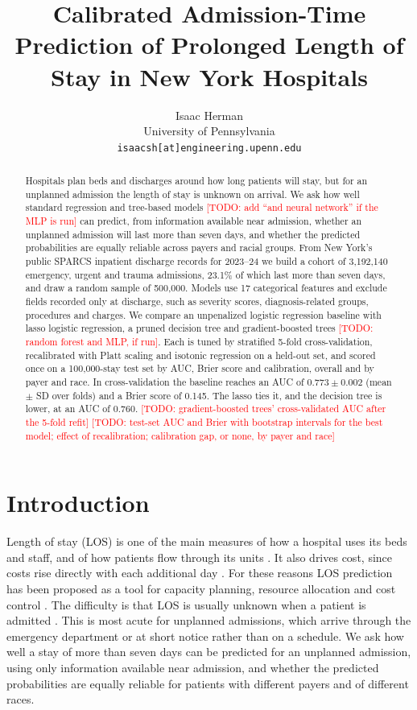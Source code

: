 \documentclass{article}
\title{Calibrated Admission-Time Prediction of Prolonged Length of Stay in New York Hospitals}
\author{%
  Isaac Herman \\
  University of Pennsylvania \\
  \texttt{isaacsh[at]engineering.upenn.edu} \\
}
\newcommand{\todo}[1]{\textcolor{red}{[TODO: #1]}}
\begin{document}
\maketitle

\begin{abstract}
  Hospitals plan beds and discharges around how long patients will stay, but
  for an unplanned admission the length of stay is unknown on arrival. We ask
  how well standard regression and tree-based models
  \todo{add ``and neural network'' if the MLP is run} can predict, from
  information available near
  admission, whether an unplanned admission will last more than seven days,
  and whether the predicted probabilities are equally reliable across payers
  and racial groups. From New York's public SPARCS inpatient discharge records
  for 2023--24 we build a cohort of 3{,}192{,}140 emergency, urgent and trauma
  admissions, 23.1\% of which last more than seven days, and draw a random
  sample of 500{,}000. Models use 17 categorical features and exclude fields
  recorded only at discharge, such as severity scores, diagnosis-related
  groups, procedures and charges. We compare an unpenalized logistic
  regression baseline with lasso logistic regression, a pruned decision tree
  and gradient-boosted trees \todo{random forest and MLP, if run}. Each is
  tuned by stratified 5-fold cross-validation, recalibrated with Platt scaling
  and isotonic regression on a held-out set, and scored once on a
  100{,}000-stay test set by AUC, Brier score and calibration, overall and by
  payer and race. In cross-validation the baseline reaches an AUC of
  $0.773 \pm 0.002$ (mean $\pm$ SD over folds) and a Brier score of 0.145. The
  lasso ties it, and the decision tree is lower, at an AUC of 0.760.
  \todo{gradient-boosted trees' cross-validated AUC after the 5-fold refit}
  \todo{test-set AUC and Brier with bootstrap intervals for the best model;
  effect of recalibration; calibration gap, or none, by payer and race}
\end{abstract}


\section{Introduction}

Length of stay (LOS) is one of the main measures of how a hospital uses its
beds and staff, and of how patients flow through its units
\citep{stone2022}. It also drives cost, since costs rise directly with each
additional day \citep{jain2024}. For these reasons LOS prediction has been
proposed as a tool for capacity planning, resource allocation and cost control
\citep{stone2022,jain2024,zeleke2023}. The difficulty is that LOS is usually
unknown when a patient is admitted \citep{jain2024}. This is most acute for
unplanned admissions, which arrive through the emergency department or at
short notice rather than on a schedule. We ask how well a stay of more than
seven days can be predicted for an unplanned admission, using only
information available near admission, and whether the predicted
probabilities are equally reliable for patients with different payers and of
different races.
\end{document}
